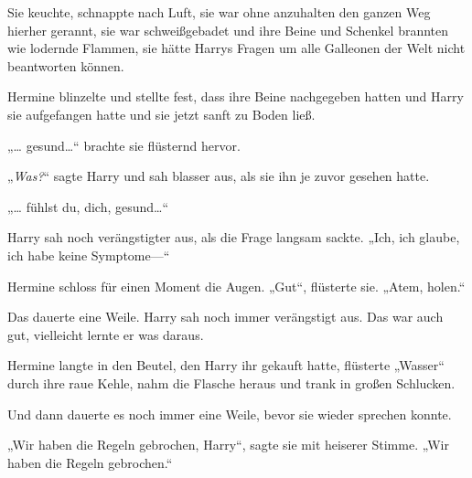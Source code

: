 Sie keuchte, schnappte nach Luft, sie war ohne anzuhalten den ganzen Weg hierher gerannt, sie war schweißgebadet und ihre Beine und Schenkel brannten wie lodernde Flammen, sie hätte Harrys Fragen um alle Galleonen der Welt nicht beantworten können.

Hermine blinzelte und stellte fest, dass ihre Beine nachgegeben hatten und Harry sie aufgefangen hatte und sie jetzt sanft zu Boden ließ.

„… gesund…“ brachte sie flüsternd hervor.

„\emph{Was?}“ sagte Harry und sah blasser aus, als sie ihn je zuvor gesehen hatte.

„… fühlst du, dich, gesund…“

Harry sah noch verängstigter aus, als die Frage langsam sackte. „Ich, ich glaube, ich habe keine Symptome—“

Hermine schloss für einen Moment die Augen. „Gut“, flüsterte sie. „Atem, holen.“

Das dauerte eine Weile. Harry sah noch immer verängstigt aus. Das war auch gut, vielleicht lernte er was daraus.

Hermine langte in den Beutel, den Harry ihr gekauft hatte, flüsterte „Wasser“ durch ihre raue Kehle, nahm die Flasche heraus und trank in großen Schlucken.

Und dann dauerte es noch immer eine Weile, bevor sie wieder sprechen konnte.

„Wir haben die Regeln gebrochen, Harry“, sagte sie mit heiserer Stimme. „Wir haben die Regeln gebrochen.“

